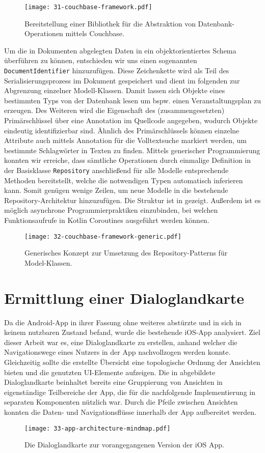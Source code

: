 \begin{figure}[H]
    \texttt{[image: 31-couchbase-framework.pdf]}
    \vspace{-25mm}
    \caption{Bereitstellung einer Bibliothek für die Abstraktion von Datenbank-Operationen mittels Couchbase.}\label{fig:couchbase-framework}
\end{figure}


Um die in Dokumenten abgelegten Daten in ein objektorientiertes Schema überführen zu können, entschieden wir uns einen sogenannten
\texttt{DocumentIdentifier} hinzuzufügen. Diese Zeichenkette wird als Teil des Serialisierungsprozess im Dokument gespeichert und dient im folgenden zur Abgrenzung einzelner Modell-Klassen. Damit lassen sich Objekte eines bestimmten Typs von der Datenbank lesen um bspw. einen Veranstaltungsplan zu erzeugen. Des Weiteren wird die Eigenschaft des (zusammengesetzten) Primärschlüssel über eine Annotation im Quellcode angegeben, wodurch Objekte eindeutig identifizierbar sind. Ähnlich des Primärschlüssels können einzelne Attribute auch mittels Annotation für die Volltextsuche markiert werden, um bestimmte Schlagwörter in Texten zu finden. Mittels generischer Programmierung konnten wir erreiche, dass sämtliche Operationen durch einmalige Definition in der Basisklasse \texttt{Repository} anschließend für alle Modelle entsprechende Methoden bereitstellt, welche die notwendigen Typen automatisch inferieren kann. Somit genügen wenige Zeilen, um neue Modelle in die bestehende Repository-Architektur hinzuzufügen. Die Struktur ist in  gezeigt. Außerdem ist es möglich asynchrone Programmierpraktiken einzubinden, bei welchen Funktionsaufrufe in Kotlin Coroutines ausgeführt werden können.

\begin{figure}[H]
    \texttt{[image: 32-couchbase-framework-generic.pdf]}
    \caption{Generisches Konzept zur Umsetzung des Repository-Patterns für Model-Klassen.}\label{fig:couchbase-framework-generic}
\end{figure}

\section{Ermittlung einer Dialoglandkarte}\label{sec:app-architecture-mindmap}

Da die Android-App in ihrer Fassung ohne weiteres abstürzte und in sich in keinem nutzbaren Zustand befand, wurde die bestehende iOS-App analysiert. Ziel dieser Arbeit war es, eine Dialoglandkarte zu erstellen, anhand welcher die Navigationswege eines Nutzers in der App nachvollzogen werden konnte. Gleichzeitig sollte die erstellte Übersicht eine topologische Ordnung der Ansichten bieten und die genutzten UI-Elemente aufzeigen. Die in  abgebildete Dialoglandkarte beinhaltet bereits eine Gruppierung von Ansichten in eigenständige Teilbereiche der App, die für die nachfolgende Implementierung in separaten Komponenten nützlich war. Durch die Pfeile zwischen Ansichten konnten die Daten- und Navigationsflüsse innerhalb der App aufbereitet werden. 

\begin{figure}[H]
    \texttt{[image: 33-app-architecture-mindmap.pdf]}
    \caption{Die Dialoglandkarte zur vorangegangenen Version der iOS App.}\label{fig:app-architecture-mindmap}
\end{figure}
